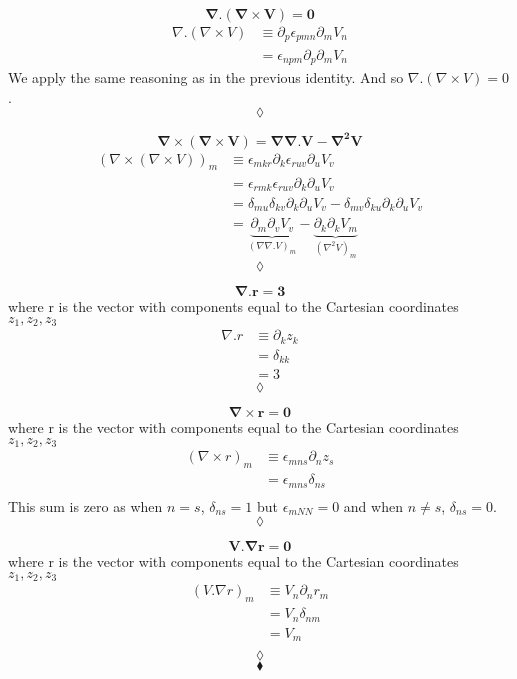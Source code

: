 $$ \mathbf{\nabla . \left(\nabla\times V \right)= 0}$$
\begin{align*}
\nabla . \left(\nabla\times V \right)&\equiv \partial_p\epsilon_{pmn} \partial_mV_n\\
&=\epsilon_{npm} \partial_p \partial_m V_n
\end{align*}
We apply the same reasoning as in the previous identity. And so $\nabla . \left(\nabla\times V \right) = 0$.
$$\lozenge$$

$$ \mathbf{\nabla \times \left(\nabla\times V \right)= \nabla\nabla.V-\nabla^2V}$$
\begin{align*}
\left(\nabla \times \left(\nabla\times V \right)\right)_m&\equiv \epsilon_{mkr} \partial_k \epsilon_{ruv} \partial_uV_v\\
&=\epsilon_{rmk} \epsilon_{ruv}\partial_k  \partial_u V_v\\
&=\delta_{mu}\delta_{kv}\partial_k  \partial_u V_v-\delta_{mv}\delta_{ku}\partial_k  \partial_u V_v\\
&=\underbrace{\partial_m  \partial_v V_v}_{\left(\nabla\nabla.V\right)_m}-\underbrace{\partial_k  \partial_k V_m}_{\left(\nabla^2 V\right)_m}
\end{align*}
$$\lozenge$$

$$ \mathbf{\nabla .r= 3}$$
where r is the vector with components equal to the Cartesian coordinates $z_1,z_2,z_3$
\begin{align*}
\nabla .r &\equiv \partial_k z_k\\
&=\delta_{kk}\\
&=3
\end{align*}
$$\lozenge$$

$$ \mathbf{\nabla \times r= 0}$$
where r is the vector with components equal to the Cartesian coordinates $z_1,z_2,z_3$
\begin{align*}
\left(\nabla \times r\right)_m &\equiv \epsilon_{mns}\partial_n z_s\\
&=\epsilon_{mns}\delta_{ns}\\
\end{align*}
This sum is zero as when $n=s$, $\delta_{ns}=1$ but $\epsilon_{mNN}=0$ and when $n\ne s$, $\delta_{ns}=0$.
$$\lozenge$$

$$ \mathbf{V .\nabla r= 0}$$
where r is the vector with components equal to the Cartesian coordinates $z_1,z_2,z_3$
\begin{align*}
\left(V .\nabla r\right)_m &\equiv V_n \partial_n r_m\\
&=V_n \delta_{nm}\\
&=V_m\\
\end{align*}
$$\lozenge$$
$$\blacklozenge$$
\newpage

